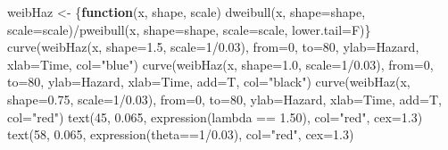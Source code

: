 \documentclass[
]{book}
\newenvironment{Shaded}{\begin{snugshade}}{\end{snugshade}}
\newcommand{\AttributeTok}[1]{\textcolor[rgb]{0.77,0.63,0.00}{#1}}
\newcommand{\ControlFlowTok}[1]{\textcolor[rgb]{0.13,0.29,0.53}{\textbf{#1}}}
\newcommand{\DecValTok}[1]{\textcolor[rgb]{0.00,0.00,0.81}{#1}}
\newcommand{\FloatTok}[1]{\textcolor[rgb]{0.00,0.00,0.81}{#1}}
\newcommand{\FunctionTok}[1]{\textcolor[rgb]{0.00,0.00,0.00}{#1}}
\newcommand{\NormalTok}[1]{#1}
\newcommand{\OtherTok}[1]{\textcolor[rgb]{0.56,0.35,0.01}{#1}}
\newcommand{\SpecialCharTok}[1]{\textcolor[rgb]{0.00,0.00,0.00}{#1}}
\newcommand{\StringTok}[1]{\textcolor[rgb]{0.31,0.60,0.02}{#1}}
\theoremstyle{definition}
\theoremstyle{definition}
\theoremstyle{definition}
\theoremstyle{definition}
\theoremstyle{remark}
\begin{document}
\begin{Shaded}
\begin{Highlighting}[]
\NormalTok{weibHaz }\OtherTok{\textless{}{-}}\NormalTok{ \{}\ControlFlowTok{function}\NormalTok{(x, shape, scale) }\FunctionTok{dweibull}\NormalTok{(x, }\AttributeTok{shape=}\NormalTok{shape,}
     \AttributeTok{scale=}\NormalTok{scale)}\SpecialCharTok{/}\FunctionTok{pweibull}\NormalTok{(x, }\AttributeTok{shape=}\NormalTok{shape, }\AttributeTok{scale=}\NormalTok{scale, }\AttributeTok{lower.tail=}\NormalTok{F)\}}
\FunctionTok{curve}\NormalTok{(}\FunctionTok{weibHaz}\NormalTok{(x, }\AttributeTok{shape=}\FloatTok{1.5}\NormalTok{, }\AttributeTok{scale=}\DecValTok{1}\SpecialCharTok{/}\FloatTok{0.03}\NormalTok{), }\AttributeTok{from=}\DecValTok{0}\NormalTok{, }\AttributeTok{to=}\DecValTok{80}\NormalTok{, }
     \AttributeTok{ylab=}\StringTok{\textquotesingle{}Hazard\textquotesingle{}}\NormalTok{, }\AttributeTok{xlab=}\StringTok{\textquotesingle{}Time\textquotesingle{}}\NormalTok{, }\AttributeTok{col=}\StringTok{"blue"}\NormalTok{)}
\FunctionTok{curve}\NormalTok{(}\FunctionTok{weibHaz}\NormalTok{(x, }\AttributeTok{shape=}\FloatTok{1.0}\NormalTok{, }\AttributeTok{scale=}\DecValTok{1}\SpecialCharTok{/}\FloatTok{0.03}\NormalTok{), }\AttributeTok{from=}\DecValTok{0}\NormalTok{, }\AttributeTok{to=}\DecValTok{80}\NormalTok{, }
     \AttributeTok{ylab=}\StringTok{\textquotesingle{}Hazard\textquotesingle{}}\NormalTok{, }\AttributeTok{xlab=}\StringTok{\textquotesingle{}Time\textquotesingle{}}\NormalTok{, }\AttributeTok{add=}\NormalTok{T, }\AttributeTok{col=}\StringTok{"black"}\NormalTok{)}
\FunctionTok{curve}\NormalTok{(}\FunctionTok{weibHaz}\NormalTok{(x, }\AttributeTok{shape=}\FloatTok{0.75}\NormalTok{, }\AttributeTok{scale=}\DecValTok{1}\SpecialCharTok{/}\FloatTok{0.03}\NormalTok{), }\AttributeTok{from=}\DecValTok{0}\NormalTok{, }\AttributeTok{to=}\DecValTok{80}\NormalTok{, }
     \AttributeTok{ylab=}\StringTok{\textquotesingle{}Hazard\textquotesingle{}}\NormalTok{, }\AttributeTok{xlab=}\StringTok{\textquotesingle{}Time\textquotesingle{}}\NormalTok{, }\AttributeTok{add=}\NormalTok{T, }\AttributeTok{col=}\StringTok{"red"}\NormalTok{)}
\FunctionTok{text}\NormalTok{(}\DecValTok{45}\NormalTok{, }\FloatTok{0.065}\NormalTok{, }\FunctionTok{expression}\NormalTok{(lambda }\SpecialCharTok{==} \FloatTok{1.50}\NormalTok{), }\AttributeTok{col=}\StringTok{"red"}\NormalTok{, }\AttributeTok{cex=}\FloatTok{1.3}\NormalTok{)}
\FunctionTok{text}\NormalTok{(}\DecValTok{58}\NormalTok{, }\FloatTok{0.065}\NormalTok{, }\FunctionTok{expression}\NormalTok{(theta}\SpecialCharTok{==}\DecValTok{1}\SpecialCharTok{/}\FloatTok{0.03}\NormalTok{), }\AttributeTok{col=}\StringTok{"red"}\NormalTok{, }\AttributeTok{cex=}\FloatTok{1.3}\NormalTok{)}

\end{Highlighting}
\end{Shaded}
\end{document}
